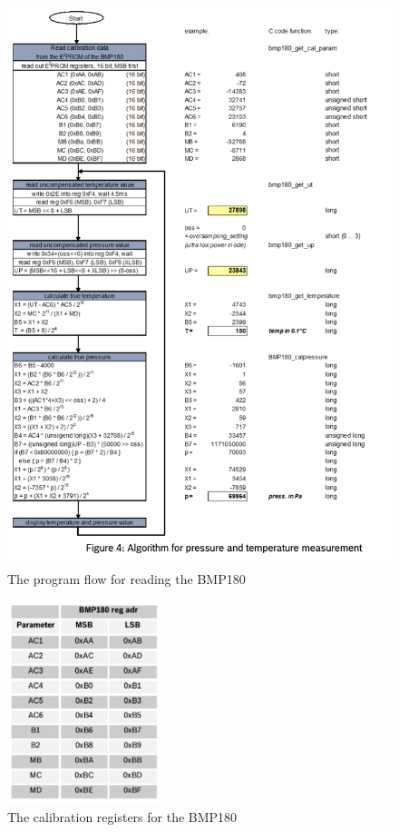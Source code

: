 			\begin{figure}[h!]
				\centering
				\includegraphics[height=0.95\textheight, angle=0]{BMP180flowchart}
				\caption{The program flow for reading the BMP180}
				\label{fig:BMP180flowchart}
			\end{figure}
			
			\begin{figure}[h!]
				\centering
				\includegraphics[width=0.4\textwidth, angle=0]{BMP180calibration}
				\caption{The calibration registers for the BMP180}
				\label{fig:BMP180calibration}
			\end{figure}
			
